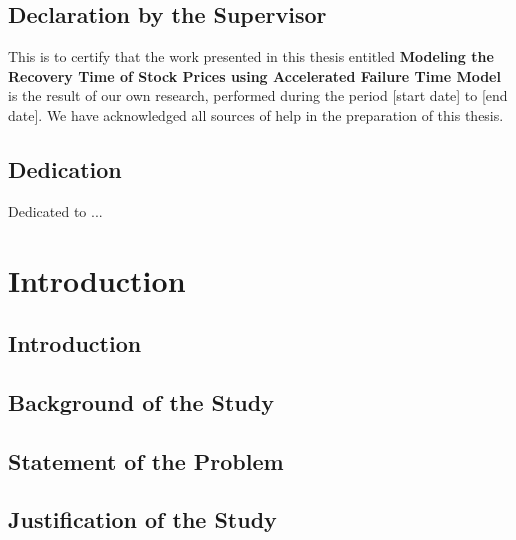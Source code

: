 \documentclass[12pt,a4paper,twoside]{Thesis}
\begin{document}
\newpage
\thispagestyle{empty}
\mbox{}

\newpage


\begin{titlepage}
\section*{Declaration by the Supervisor}

This is to certify that the work presented in this thesis entitled \textbf{Modeling the Recovery Time of Stock Prices using Accelerated Failure Time Model} is the result of our own research, performed during the period [start date] to [end date]. We have acknowledged all sources of help in the preparation of this thesis.

\vspace{1cm}
\end{titlepage}
\newpage
\thispagestyle{empty}
\mbox{}

\newpage


\begin{titlepage}
\section*{Dedication}

Dedicated to ...
\vspace{1cm}
\end{titlepage}
\newpage
\thispagestyle{empty}
\mbox{}

\newpage



\tableofcontents 

\chapter{Introduction}
\section{Introduction}
\section{Background of the Study}
\section{Statement of the Problem}
\section{Justification of the Study}
\end{document}
